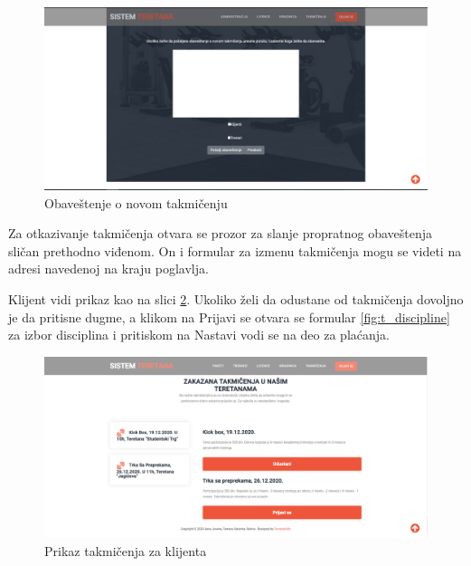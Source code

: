 \documentclass[../main.tex]{subfiles}
\begin{document}
\begin{figure}[!ht]
\begin{center}
\includegraphics[scale=0.35]{sections/korisnicki_interfejs/screenshots/takmicenja_kreiranje_obavestenje.PNG}
\end{center}
\caption{Obaveštenje o novom takmičenju}
\label{fig:t_kreiranje_ob}
\end{figure}

Za otkazivanje takmičenja otvara se prozor za slanje propratnog obaveštenja sličan prethodno viđenom. On i formular za izmenu takmičenja mogu se videti na adresi navedenoj na kraju poglavlja.

Klijent vidi prikaz kao na slici \ref{fig:t_klijent}. Ukoliko želi da odustane od takmičenja dovoljno je da pritisne dugme, a klikom na Prijavi se otvara se formular \ref{fig:t_discipline} za izbor disciplina i pritiskom na Nastavi vodi se na deo za plaćanja. 

\begin{figure}[!ht]
\begin{center}
\includegraphics[scale=0.35]{sections/korisnicki_interfejs/screenshots/takmicenja_klijent.PNG}
\end{center}
\caption{Prikaz takmičenja za klijenta}
\label{fig:t_klijent}
\end{figure}
\end{document}
